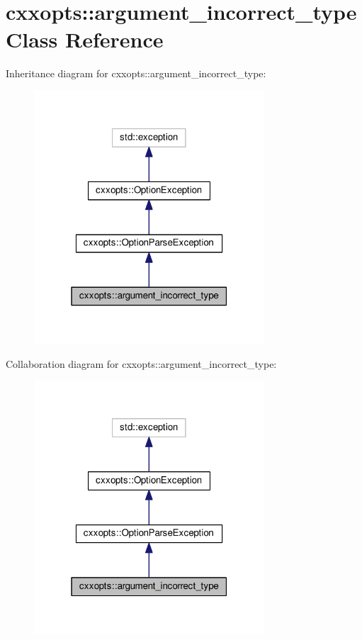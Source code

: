 \hypertarget{classcxxopts_1_1argument__incorrect__type}{}\section{cxxopts\+:\+:argument\+\_\+incorrect\+\_\+type Class Reference}
\label{classcxxopts_1_1argument__incorrect__type}


Inheritance diagram for cxxopts\+:\+:argument\+\_\+incorrect\+\_\+type\+:
\nopagebreak
\begin{figure}[H]
\begin{center}
\leavevmode
\includegraphics[width=244pt]{classcxxopts_1_1argument__incorrect__type__inherit__graph}
\end{center}
\end{figure}


Collaboration diagram for cxxopts\+:\+:argument\+\_\+incorrect\+\_\+type\+:
\nopagebreak
\begin{figure}[H]
\begin{center}
\leavevmode
\includegraphics[width=244pt]{classcxxopts_1_1argument__incorrect__type__coll__graph}
\end{center}
\end{figure}
